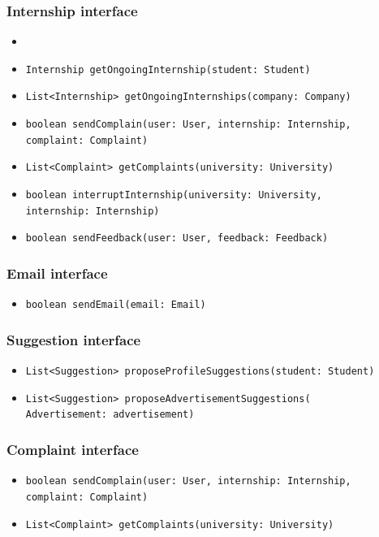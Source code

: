 \subsubsection{Internship interface}
\begin{itemize}
    \item
    \item \verb|Internship getOngoingInternship(student: Student)|
    \item \verb|List<Internship> getOngoingInternships(company: Company)|
    \item \verb|boolean sendComplain(user: User, internship: Internship, | \\ \makebox[10em][l]{} \verb|complaint: Complaint)|
    \item \verb|List<Complaint> getComplaints(university: University)|
    \item \verb|boolean interruptInternship(university: University, | \\ \makebox[10em][l]{} \verb|internship: Internship)|
    \item \verb|boolean sendFeedback(user: User, feedback: Feedback)|
\end{itemize}

\subsubsection{Email interface}
\begin{itemize}
    \item \verb|boolean sendEmail(email: Email)|
\end{itemize}

\subsubsection{Suggestion interface}
\begin{itemize}
    \item \verb|List<Suggestion> proposeProfileSuggestions(student: Student)|
    \item \verb|List<Suggestion> proposeAdvertisementSuggestions(| \\ \makebox[10em][l]{} \verb|Advertisement: advertisement)|
\end{itemize}

\subsubsection{Complaint interface}
\begin{itemize}
    \item \verb|boolean sendComplain(user: User, internship: Internship, | \\ \makebox[10em][l]{} \verb|complaint: Complaint)|
    \item \verb|List<Complaint> getComplaints(university: University)|
\end{itemize}

